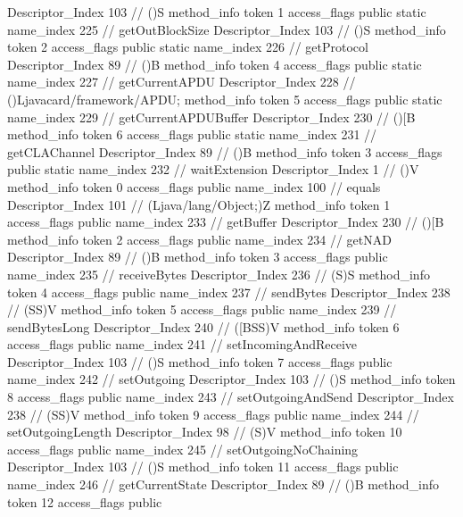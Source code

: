 {{{{{					Descriptor_Index	103		// ()S
				}
				method_info {
					token	1
					access_flags	public static
					name_index	225		// getOutBlockSize
					Descriptor_Index	103		// ()S
				}
				method_info {
					token	2
					access_flags	public static
					name_index	226		// getProtocol
					Descriptor_Index	89		// ()B
				}
				method_info {
					token	4
					access_flags	public static
					name_index	227		// getCurrentAPDU
					Descriptor_Index	228		// ()Ljavacard/framework/APDU;
				}
				method_info {
					token	5
					access_flags	public static
					name_index	229		// getCurrentAPDUBuffer
					Descriptor_Index	230		// ()[B
				}
				method_info {
					token	6
					access_flags	public static
					name_index	231		// getCLAChannel
					Descriptor_Index	89		// ()B
				}
				method_info {
					token	3
					access_flags	public static
					name_index	232		// waitExtension
					Descriptor_Index	1		// ()V
				}
				method_info {
					token	0
					access_flags	public
					name_index	100		// equals
					Descriptor_Index	101		// (Ljava/lang/Object;)Z
				}
				method_info {
					token	1
					access_flags	public
					name_index	233		// getBuffer
					Descriptor_Index	230		// ()[B
				}
				method_info {
					token	2
					access_flags	public
					name_index	234		// getNAD
					Descriptor_Index	89		// ()B
				}
				method_info {
					token	3
					access_flags	public
					name_index	235		// receiveBytes
					Descriptor_Index	236		// (S)S
				}
				method_info {
					token	4
					access_flags	public
					name_index	237		// sendBytes
					Descriptor_Index	238		// (SS)V
				}
				method_info {
					token	5
					access_flags	public
					name_index	239		// sendBytesLong
					Descriptor_Index	240		// ([BSS)V
				}
				method_info {
					token	6
					access_flags	public
					name_index	241		// setIncomingAndReceive
					Descriptor_Index	103		// ()S
				}
				method_info {
					token	7
					access_flags	public
					name_index	242		// setOutgoing
					Descriptor_Index	103		// ()S
				}
				method_info {
					token	8
					access_flags	public
					name_index	243		// setOutgoingAndSend
					Descriptor_Index	238		// (SS)V
				}
				method_info {
					token	9
					access_flags	public
					name_index	244		// setOutgoingLength
					Descriptor_Index	98		// (S)V
				}
				method_info {
					token	10
					access_flags	public
					name_index	245		// setOutgoingNoChaining
					Descriptor_Index	103		// ()S
				}
				method_info {
					token	11
					access_flags	public
					name_index	246		// getCurrentState
					Descriptor_Index	89		// ()B
				}
				method_info {
					token	12
					access_flags	public
}}}}}
